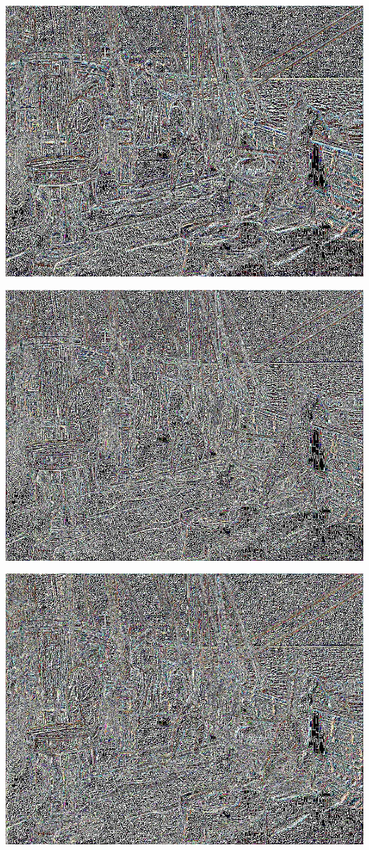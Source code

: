 \documentclass[a4paper,12pt]{article}
\begin{document}
\begin{center}
\includegraphics[width=0.8\linewidth,height=0.7\textheight]{Preconditioning/test_AVERAGE3}
\end{center}

\begin{center}
\includegraphics[width=0.8\linewidth,height=0.7\textheight]{Preconditioning/test_AVERAGE4}
\end{center}

\begin{center}
\includegraphics[width=0.8\linewidth,height=0.7\textheight]{Preconditioning/test_AVERAGE5}
\end{center}
\end{document}
